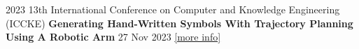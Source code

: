 
\begin{cventries}
    \cventry
    {2023 13th International Conference on Computer and Knowledge Engineering (ICCKE)}
    {\textbf {Generating Hand-Written Symbols With Trajectory Planning Using A Robotic Arm}}
    {}
    {27 Nov 2023}
    {\href{https://ieeexplore.ieee.org/document/10326253}{\textcolor{cobalt}{[more info]}}\newline}
    \vspace{0.35 cm}

\end{cventries}